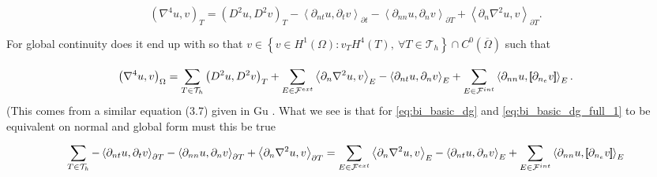 \begin{equation}
\label{eq:bi_basic_dg}
\left( \nabla ^{4} u,v \right) _{T} = \left( D^2u,D^2v \right) _{T } - \left<\partial _{nt} u, \partial _{t}v
\right>_{\partial t} - \left<\partial _{nn} u, \partial _{n}v \right>_{\partial T} + \left<\partial _{n} \nabla ^2 u,v
\right>_{\partial T}
.\end{equation}

For global continuity does it end up with  so that $v \in \left\{ v \in H^{1}\left( \Omega  \right): v_{T} H^{4}\left( T \right), \ \forall T \in
\mathcal{T}_{h}    \right\}   \cap C^{0} (
\overline{\Omega }  ) $ such that

\begin{equation}
\label{eq:bi_basic_dg_full_1}
\left( \nabla ^{4} u, v \right) _{\Omega }
= \sum_{T \in  \mathcal{T} _{h}}^{} \left( D^2u, D^2v \right)_{T}  + \sum_{E \in
\mathcal{F} ^{ext}_{}}^{} \left<\partial _{n} \nabla  ^2 u, v  \right> _{E}
- \left<\partial _{nt} u, \partial _{n} v \right> _{E}
+ \sum_{E \in \mathcal{F}  ^{int}}^{} \left<\partial _{nn} u , \left[\!\!\left[  \partial _{n_{e}} v  \right]\!\!\right]
\right>_{E}
.\end{equation}
(This comes from a similar equation (3.7) given in Gu \cite{gu2012c0}.
What we see is that for \eqref{eq:bi_basic_dg} and \eqref{eq:bi_basic_dg_full_1} to be equivalent on normal and global form must this be true
\[
 \sum_{T \in  \mathcal{T}_{h} }^{}  - \left<\partial _{nt} u, \partial _{t}v
\right>_{\partial T} - \left<\partial _{nn} u, \partial _{n}v \right>_{\partial T} + \left<\partial _{n} \nabla ^2 u,v
\right>_{\partial T}
=  \sum_{E \in
\mathcal{F}^{ext}  }^{} \left<\partial _{n} \nabla  ^2 u, v  \right> _{E}
- \left<\partial _{nt} u, \partial _{n} v \right> _{E}
+ \sum_{E \in \mathcal{F}^{int} }^{} \left<\partial _{nn} u , \left[\!\!\left[  \partial _{n_{e}} v  \right]\!\!\right]
\right>_{E}
\]





